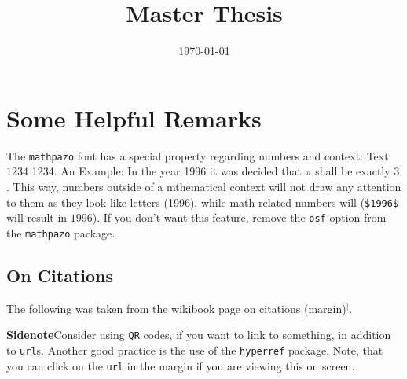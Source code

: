 \documentclass[english,ngerman,paper=a5,headsepline=true,9pt,DIV=12,BCOR=0.7cm]{scrbook}
\title{Master Thesis} %
\author{\authorstring}
\date{\today} %
\begin{document}
\recalctypearea
\maketitle
{} %
\recalctypearea

\tableofcontents


\chapter{Some Helpful Remarks}
The \texttt{mathpazo} font has a special property regarding numbers and
context: Text $1234$ 1234. An Example: In the year 1996 it was decided
that $\pi$ shall be exactly $3$. This way, numbers outside of a
mthematical context will not draw any attention to them as they look
like letters (1996), while math related numbers will (\verb|$1996$|
will result in $1996$). If you don't want this feature, remove the
\texttt{osf} option from the \texttt{mathpazo} package.

\section{On Citations}
\label{sec:citations}
The following was taken from the wikibook page on citations
(margin)$^]$. \\
\begin{minipage}{0.8\linewidth}
  \textbf{Sidenote}\qquad Consider using \texttt{QR} codes, if you
  want to link to something, in addition to \texttt{url}s. Another
  good practice is the use of the \texttt{hyperref} package. Note, that
  you can click on the \texttt{url} in the margin if you are viewing
  this on screen. %
\end{minipage}
\vspace*{0.03\linewidth}
\begin{minipage}{0.17\linewidth}
  	\textcolor{black}{}
\end{minipage}
\end{document}

